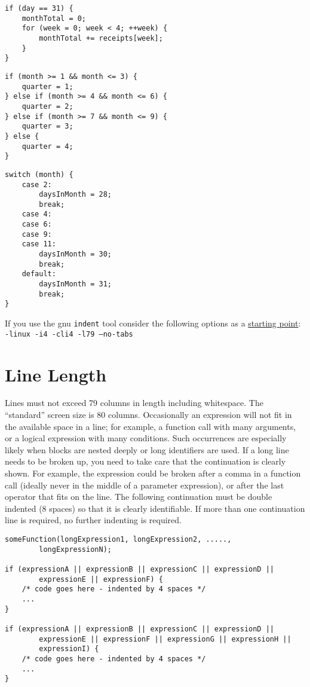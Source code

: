 \documentclass{article}
\begin{document}
\begin{lstlisting}
if (day == 31) {
    monthTotal = 0;
    for (week = 0; week < 4; ++week) {
        monthTotal += receipts[week];
    }
}
\end{lstlisting}

\begin{lstlisting}
if (month >= 1 && month <= 3) {
    quarter = 1;
} else if (month >= 4 && month <= 6) {
    quarter = 2;
} else if (month >= 7 && month <= 9) {
    quarter = 3;
} else {
    quarter = 4;
}
\end{lstlisting}

\begin{lstlisting}
switch (month) {
    case 2:
        daysInMonth = 28;
        break;
    case 4:
    case 6:
    case 9:
    case 11:
        daysInMonth = 30;
        break;
    default:
        daysInMonth = 31;
        break;
}
\end{lstlisting}

If you use the gnu \texttt{indent} tool consider the following options as a \underline{starting point}:\\
\texttt{-linux -i4 -cli4 -l79 --no-tabs}

\clearpage
\section{Line Length}
Lines must not exceed 79 columns in length including whitespace.
The ``standard'' screen size is 80 columns.
Occasionally an expression will not fit in the available space in a line; for example, a function call with many arguments, or a logical expression with many conditions.
Such occurrences are especially likely when blocks are nested deeply or long identifiers are used.
If a long line needs to be broken up, you need to take care that the continuation is clearly shown.
For example, the expression could be broken after a comma in a function call (ideally never in the middle of a parameter expression), or after the last operator that fits on the line.
The following continuation must be double indented (8 spaces) so that it is clearly identifiable.
If more than one continuation line is required, no further indenting is required.

\begin{lstlisting}
someFunction(longExpression1, longExpression2, .....,
        longExpressionN);

if (expressionA || expressionB || expressionC || expressionD ||
        expressionE || expressionF) {
    /* code goes here - indented by 4 spaces */
    ...
}

if (expressionA || expressionB || expressionC || expressionD ||
        expressionE || expressionF || expressionG || expressionH ||
        expressionI) {
    /* code goes here - indented by 4 spaces */
    ...
}
\end{lstlisting}
\end{document}
